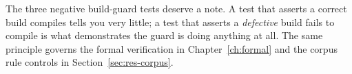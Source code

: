 The three negative build-guard tests deserve a note. A test that asserts a correct build
compiles tells you very little; a test that asserts a \emph{defective} build fails to compile is
what demonstrates the guard is doing anything at all. The same principle governs the formal
verification in Chapter~\ref{ch:formal} and the corpus rule controls in
Section~\ref{sec:res-corpus}.

